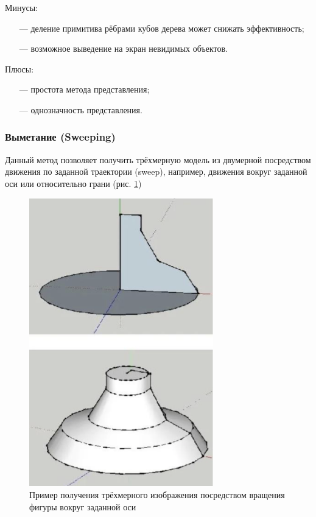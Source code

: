 Минусы:
\begin{itemize}[leftmargin=1.6\parindent]
	\item[---] деление примитива рёбрами кубов дерева может снижать 
	эффективность;
	\item[---] возможное выведение на экран невидимых объектов.
\end{itemize}

Плюсы:
\begin{itemize}[leftmargin=1.6\parindent]
	\item[---] простота метода представления;
	\item[---] однозначность представления.
\end{itemize}


\subsubsection{Выметание (Sweeping)}

Данный метод \cite{sweeping} позволяет получить трёхмерную модель из двумерной 
посредством движения по заданной траектории (sweep), например, движения 
вокруг заданной оси или относительно грани (рис. \ref{fig:sweeping})

\begin{figure}[h]
	\centering
	\captionsetup{justification=centering}
	\includegraphics[width=80mm]{img/sweeping.png}
	\caption{Пример получения трёхмерного изображения посредством 
		вращения фигуры вокруг заданной оси}
	\label{fig:sweeping}
\end{figure}

